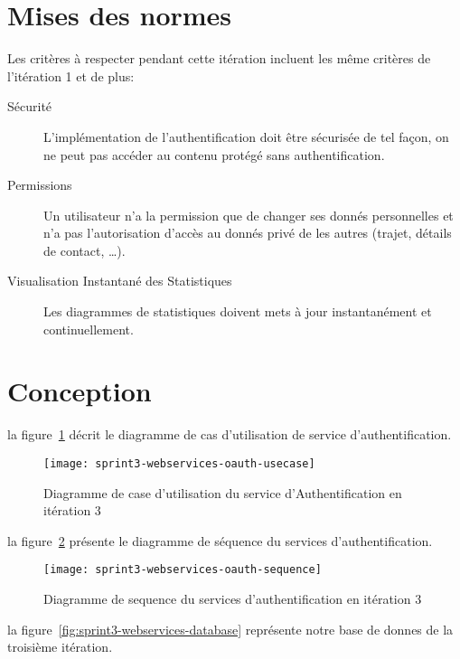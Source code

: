 \section{Mises des normes}

Les critères à respecter pendant cette itération incluent les même critères de
l'itération 1 et de plus:

\begin{description}
    \item [Sécurité] L'implémentation de l'authentification doit être sécurisée
        de tel façon, on ne peut pas accéder au contenu protégé sans
        authentification.
    \item [Permissions] Un utilisateur n'a la permission que de changer ses
        donnés personnelles et n'a pas l'autorisation d'accès au donnés privé
        de les autres (trajet, détails de contact, \ldots).
    \item [Visualisation Instantané des Statistiques] Les diagrammes de
        statistiques doivent mets à jour instantanément et continuellement.
\end{description}

\section{Conception}

la figure~\ref{fig:sprint3-webservices-oauth-usecase} décrit le diagramme
de cas d'utilisation de service d'authentification.

\begin{figure}[htbp]
    \centering
    \texttt{[image: sprint3-webservices-oauth-usecase]}
    \caption{Diagramme de case d'utilisation du service d'Authentification en itération 3}
      \label{fig:sprint3-webservices-oauth-usecase}
\end{figure}

la figure~\ref{fig:sprint3-webservices-oauth-sequence} présente le diagramme de
séquence du services d'authentification.

\begin{figure}[htbp]
    \centering
    \texttt{[image: sprint3-webservices-oauth-sequence]}
    \caption{Diagramme de sequence du services d'authentification en itération 3}
    \label{fig:sprint3-webservices-oauth-sequence}
\end{figure}

la figure~\ref{fig:sprint3-webservices-database} représente notre base de
donnes de la troisième itération.

